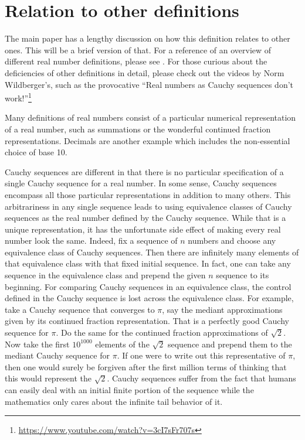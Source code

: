 \documentclass[12pt]{article}
\begin{document}
\section{Relation to other definitions}

The main paper has a lengthy discussion on how this definition relates to other ones. This will be a brief version of that. For a reference of an overview of different real number definitions, please see \cite{ittay-2015}. For those curious about the deficiencies of other definitions in detail, please check out the videos by Norm Wildberger's, such as the provocative ``Real numbers as Cauchy sequences don't work!''\footnote{\url{https://www.youtube.com/watch?v=3cI7sFr707s}} 

Many definitions of real numbers consist of a particular numerical representation of a real number, such as summations or the wonderful continued fraction representations. Decimals are another example which includes the non-essential choice of base 10. 

Cauchy sequences are different in that there is no particular specification of a single Cauchy sequence for a real number. In some sense, Cauchy sequences encompass all those particular representations in addition to many others. This arbitrariness in any single sequence leads to using equivalence classes of Cauchy sequences as the real number defined by the Cauchy sequence. While that is a unique representation, it has the unfortunate side effect of making every real number look the same. Indeed, fix a sequence of $n$ numbers and choose any equivalence class of Cauchy sequences. Then there are infinitely many elements of that equivalence class with that fixed initial sequence. In fact, one can take any sequence in the equivalence class and prepend the given $n$ sequence to its beginning.  For comparing Cauchy sequences in an equivalence class, the control defined in the Cauchy sequence is lost across the equivalence class. For example, take a Cauchy sequence that converges to $\pi$, say the mediant approximations given by its continued fraction representation. That is a perfectly good Cauchy sequence for $\pi$. Do the same for the continued fraction approximations of $\sqrt{2}$.  Now take the first $10^{1000}$ elements of the $\sqrt{2}$ sequence and prepend them to  the mediant Cauchy sequence for $\pi$. If one were to write out this representative of $\pi$, then one would surely be forgiven after the first million terms of thinking that this would represent the $\sqrt{2}$. Cauchy sequences suffer from the fact that humans can easily deal with an initial finite portion of the sequence while the mathematics only cares about the infinite tail behavior of it. 
\end{document}
